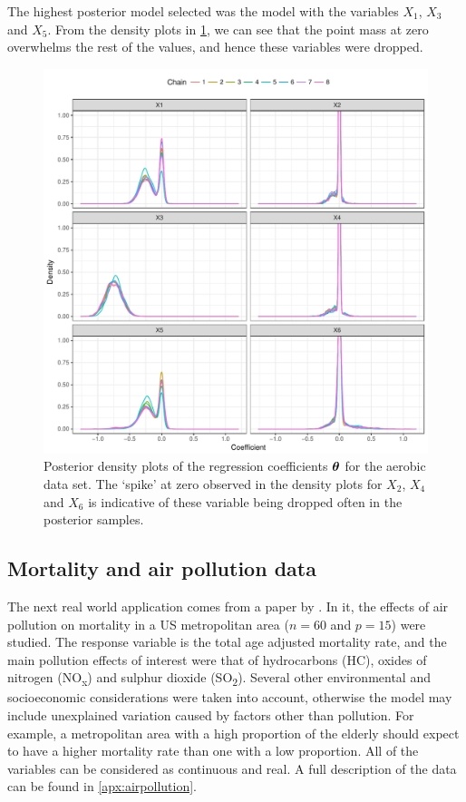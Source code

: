 \documentclass[a4paper,showframe,11pt]{report}
\begin{document}
The highest posterior model selected was the model with the variables $X_1$, $X_3$ and $X_5$.
From the density plots in \cref{fig:aerobic-densplot}, we can see that the point mass at zero overwhelms the rest of the values, and hence these variables were dropped.

\begin{figure}[htb]
  \centering
  \includegraphics[width=\textwidth]{figure/aerobic_coef}
  \caption[Posterior density plots of the regression coefficients for the aerobic data set.]{Posterior density plots of the regression coefficients ${\bm\theta}$ for the aerobic data set. The `spike' at zero observed in the density plots for $X_2$, $X_4$ and $X_6$ is indicative of these variable being dropped often in the posterior samples.}
  \label{fig:aerobic-densplot}
\end{figure}

\subsection{Mortality and air pollution data}
\label{sec:airpollution}

The next real world application comes from a paper by \citet{McDonald1973}. 
In it, the effects of air pollution on mortality in a US metropolitan area ($n=60$ and $p=15$) were studied. 
The response variable is the total age adjusted mortality rate, and the main pollution effects of interest were that of hydrocarbons (HC), oxides of nitrogen (NO\textsubscript{x}) and sulphur dioxide (SO\textsubscript{2}). 
Several other environmental and socioeconomic considerations were taken into account, otherwise the model may include unexplained variation caused by factors other than pollution. 
For example, a metropolitan area with a high proportion of the elderly should expect to have a higher mortality rate than one with a low proportion. 
All of the variables can be considered as continuous and real. 
A full description of the data can be found in \cref{apx:airpollution}. 
\end{document}
